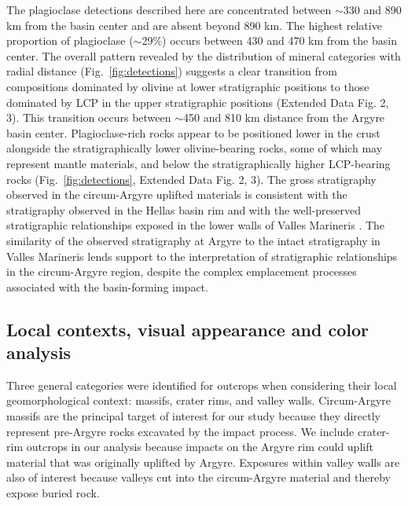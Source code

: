 \documentclass[12pt]{article}
\begin{document}
The plagioclase detections described here are concentrated between $\sim$330 and 890 km from the basin center and are absent beyond 890 km. The highest relative proportion of plagioclase ($\sim$29\%) occurs between 430 and 470 km from the basin center. The overall pattern revealed by the distribution of mineral categories with radial distance (Fig.~\ref{fig:detections}) suggests a clear transition from compositions dominated by olivine at lower stratigraphic positions to those dominated by LCP in the upper stratigraphic positions (Extended Data Fig. 2, 3). This transition occurs between $\sim$450 and 810 km distance from the Argyre basin center. Plagioclase-rich rocks appear to be positioned lower in the crust alongside the stratigraphically lower olivine-bearing rocks, some of which may represent mantle materials, and below the stratigraphically higher LCP-bearing rocks (Fig.~\ref{fig:detections}, Extended Data Fig. 2, 3). The gross stratigraphy observed in the circum-Argyre uplifted materials is consistent with the stratigraphy observed in the Hellas basin rim \citep{Phillips2022} and with the well-preserved stratigraphic relationships exposed in the lower walls of Valles Marineris \citep{Viviano-Beck2017}. The similarity of the observed stratigraphy at Argyre to the intact stratigraphy in Valles Marineris lends support to the interpretation of stratigraphic relationships in the circum-Argyre region, despite the complex emplacement processes associated with the basin-forming impact.

\subsection*{Local contexts, visual appearance and color analysis}

Three general categories were identified for outcrops when considering their local geomorphological context: massifs, crater rims, and valley walls. Circum-Argyre massifs are the principal target of interest for our study because they directly represent pre-Argyre rocks excavated by the impact process. We include crater-rim outcrops in our analysis because impacts on the Argyre rim could uplift material that was originally uplifted by Argyre. Exposures within valley walls are also of interest because valleys cut into the circum-Argyre material and thereby expose buried rock.
\end{document}
